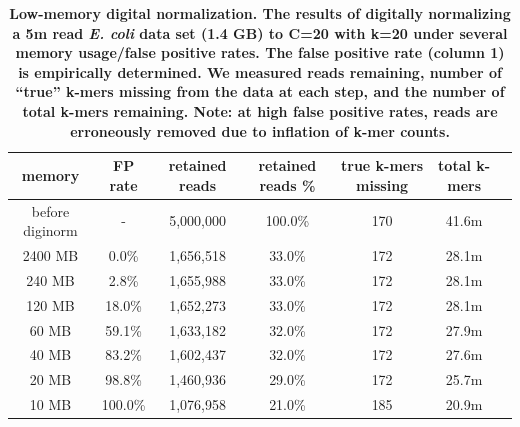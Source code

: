 \begin{table}[!ht]
\small
\caption{ \bf{Low-memory digital normalization. The results of
    digitally normalizing a 5m read {\em E. coli} data set (1.4 GB) to C=20
    with k=20 under several memory usage/false positive rates.  The
    false positive rate (column 1) is empirically determined.  We
    measured reads remaining, number of ``true'' k-mers missing from
    the data at each step, and the number of total k-mers remaining.
    Note: at high false positive rates, reads are erroneously removed due to
    inflation of k-mer counts.}}
\begin{tabular}{ | c | c | c | c | c | c | c |}
\hline
memory   & FP rate & retained reads & retained reads \% & true k-mers missing & total k-mers \\
\hline
before diginorm   &  -      & 5,000,000   & 100.0\%    & 170  &  41.6m \\
2400 MB           &   0.0\% & 1,656,518   &  33.0\%    & 172  &  28.1m \\
240 MB            &   2.8\% & 1,655,988   &  33.0\%    & 172  &  28.1m \\
120 MB            &  18.0\% & 1,652,273   &  33.0\%    & 172  &  28.1m \\
60 MB             &  59.1\% & 1,633,182   &  32.0\%    & 172  &  27.9m \\
40 MB             &  83.2\% & 1,602,437   &  32.0\%    & 172  &  27.6m \\
20 MB             &  98.8\% & 1,460,936   &  29.0\%    & 172  &  25.7m \\
10 MB             & 100.0\% & 1,076,958   &  21.0\%    & 185  &  20.9m \\
\end{tabular}
\begin{flushleft}
\end{flushleft}
\label{table:loop_norm}
\end{table}

